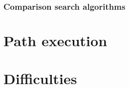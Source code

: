 \documentclass[12pt, a4paper]{report}
\begin{document}
        \subsubsection{Comparison search algorithms}
      \newpage
    \section{Path execution}
    
    \newpage
    \section{Difficulties}
    

  \printbibliography[heading=none]

\end{document}
